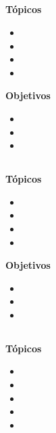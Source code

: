 \subsection{\OSNUEVEDef }\label{sec:BOK-OS9}

\textbf{Tópicos}
\begin{itemize}
	\item \OSNUEVETopicPlaneamiento
	\item \OSNUEVETopicRequerimientos
	\item \OSNUEVETopicFallos
	\item \OSNUEVETopicPreocupaciones
\end{itemize}

\textbf{Objetivos}
\begin{itemize}
	\item \OSNUEVEObjUNO
	\item \OSNUEVEObjDOS
	\item \OSNUEVEObjTRES
\end{itemize}

\subsection{\OSDIEZDef }\label{sec:BOK-OS10}

\textbf{Tópicos}
\begin{itemize}
	\item \OSDIEZTopicConceptos
	\item \OSDIEZTopicRedundancia
	\item \OSDIEZTopicMetodos
	\item \OSDIEZTopicEjemplos
\end{itemize}

\textbf{Objetivos}
\begin{itemize}
	\item \OSDIEZObjUNO
	\item \OSDIEZObjDOS
	\item \OSDIEZObjTRES
\end{itemize}

\subsection{\OSONCEDef }\label{sec:BOK-OS11}

\textbf{Tópicos}
\begin{itemize}
	\item \OSONCETopicPor
	\item \OSONCETopicQue
	\item \OSONCETopicPoliticas
	\item \OSONCETopicModelos
	\item \OSONCETopicComo
\end{itemize}

